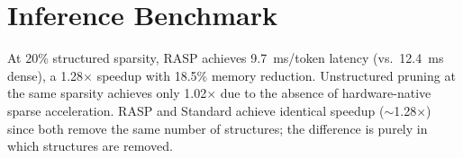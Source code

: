 \documentclass[11pt,a4paper]{article}
\newcommand{\method}{RASP}
\begin{document}
\section{Inference Benchmark}
\label{app:inference}

At 20\% structured sparsity, \method{} achieves 9.7~ms/token latency (vs.\ 12.4~ms dense), a 1.28$\times$ speedup with 18.5\% memory reduction. Unstructured pruning at the same sparsity achieves only 1.02$\times$ due to the absence of hardware-native sparse acceleration. \method{} and Standard achieve identical speedup ($\sim$1.28$\times$) since both remove the same number of structures; the difference is purely in which structures are removed.
\end{document}
